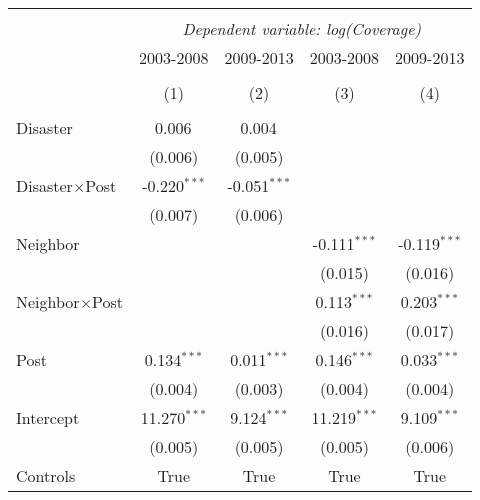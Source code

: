 
\begin{tabular}{@{\extracolsep{5pt}}lcccc}
\\[-1.8ex]\hline
\hline \\[-1.8ex]
& \multicolumn{4}{c}{\textit{Dependent variable: log(Coverage)}} \
\cr \cline{2-5}
\\[-1.8ex] & \multicolumn{1}{c}{2003-2008} & \multicolumn{1}{c}{2009-2013} & \multicolumn{1}{c}{2003-2008} & \multicolumn{1}{c}{2009-2013}  \\
\\[-1.8ex] & (1) & (2) & (3) & (4) \\
\hline \\[-1.8ex]
 Disaster & 0.006$^{}$ & 0.004$^{}$ & & \\
& (0.006) & (0.005) & & \\
 Disaster$\times$Post & -0.220$^{***}$ & -0.051$^{***}$ & & \\
& (0.007) & (0.006) & & \\
 Neighbor & & & -0.111$^{***}$ & -0.119$^{***}$ \\
& & & (0.015) & (0.016) \\
 Neighbor$\times$Post & & & 0.113$^{***}$ & 0.203$^{***}$ \\
& & & (0.016) & (0.017) \\
 Post & 0.134$^{***}$ & 0.011$^{***}$ & 0.146$^{***}$ & 0.033$^{***}$ \\
& (0.004) & (0.003) & (0.004) & (0.004) \\
Intercept & 11.270$^{***}$ & 9.124$^{***}$ & 11.219$^{***}$ & 9.109$^{***}$ \\
& (0.005) & (0.005) & (0.005) & (0.006) \\
Controls & True & True & True & True \\

\end{tabular}
